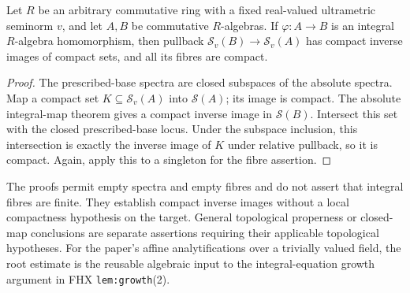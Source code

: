 \begin{corollary}\label{spectrum:relative-integral-compact-preimage}
\leanok
{}
Let $R$ be an arbitrary commutative ring with a fixed real-valued ultrametric
seminorm $v$, and let $A,B$ be commutative $R$-algebras. If
$\varphi:A\to B$ is an integral $R$-algebra homomorphism, then pullback
$\mathcal S_v(B)\to\mathcal S_v(A)$ has compact inverse images of compact
sets, and all its fibres are compact.
\end{corollary}
\begin{proof}
The prescribed-base spectra are closed subspaces of the absolute spectra.
Map a compact set $K\subseteq\mathcal S_v(A)$ into $\mathcal S(A)$; its
image is compact. The absolute integral-map theorem gives a compact inverse
image in $\mathcal S(B)$. Intersect this set with the closed prescribed-base
locus. Under the subspace inclusion, this intersection is exactly the inverse
image of $K$ under relative pullback, so it is compact. Again, apply this
to a singleton for the fibre assertion.
\end{proof}

\begin{remark}\label{spectrum:integral-compact-preimage-scope}
The proofs permit empty spectra and empty fibres and do not assert that
integral fibres are finite. They establish compact inverse images without a
local compactness hypothesis on the target. General topological properness
or closed-map conclusions are separate assertions requiring their applicable
topological hypotheses. For the paper's affine analytifications over a trivially
valued field, the root estimate is the reusable algebraic input to the
integral-equation growth argument in FHX \texttt{lem:growth}(2).
\end{remark}
